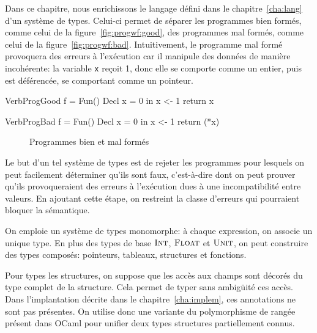 Dans ce chapitre, nous enrichissons le langage défini dans le
chapitre~\ref{cha:lang} d'un système de types. Celui-ci permet de séparer les
programmes bien formés, comme celui de la figure~\ref{fig:progwf:good}, des
programmes mal formés, comme celui de la figure~\ref{fig:progwf:bad}.
Intuitivement, le programme mal formé provoquera des erreurs à l'exécution car
il manipule des données de manière incohérente: la variable \texttt{x} reçoit 1,
donc elle se comporte comme un entier, puis est déférencée, se comportant comme
un pointeur.

\begin{SaveVerbatim}{VerbProgGood}
f = Fun() {
  Decl x = 0 in
  x <- 1
  return x
}
\end{SaveVerbatim}

\begin{SaveVerbatim}{VerbProgBad}
f = Fun() {
  Decl x = 0 in
  x <- 1
  return (*x)
}
\end{SaveVerbatim}

\begin{figure}[h]

  \centering

  \hspace{2cm}

  \caption{Programmes bien et mal formés}
\label{fig:progwf}

\end{figure}

Le but d'un tel système de types est de rejeter les programmes pour lesquels on
peut facilement déterminer qu'ils sont faux, c'est-à-dire dont on peut prouver
qu'ils provoqueraient des erreurs à l'exécution dues à une incompatibilité entre
valeurs. En ajoutant cette étape, on restreint la classe d'erreurs qui
pourraient bloquer la sémantique.

On emploie un système de types monomorphe: à chaque expression, on associe un
unique type. En plus des types de base $\textsc{Int}$, $\textsc{Float}$ et $\textsc{Unit}$, on peut
construire des types composés: pointeurs, tableaux, structures et fonctions.

Pour types les structures, on suppose que les accès aux champs sont décorés du
type complet de la structure. Cela permet de typer sans ambigüité ces accès.
Dans l'implantation décrite dans le chapitre~\ref{cha:implem}, ces annotations
ne sont pas présentes. On utilise donc une variante du polymorphisme de
rangée~\cite{ocamlObjects} présent dans OCaml pour unifier deux types structures
partiellement connus. 

